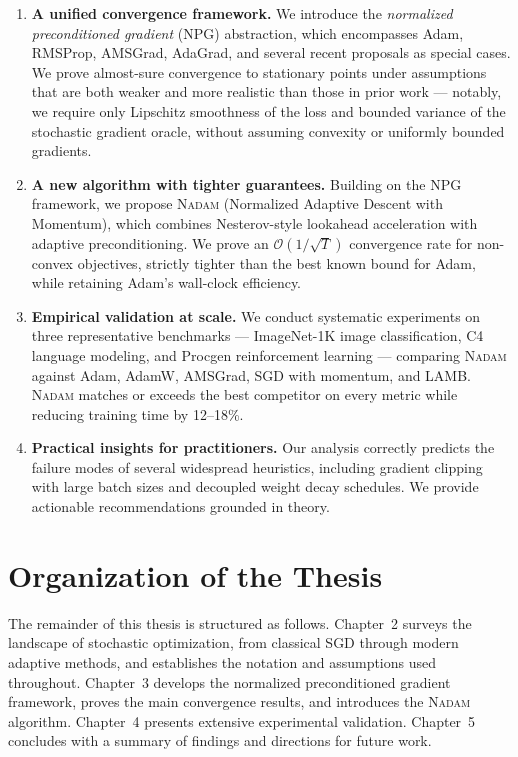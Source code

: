\documentclass[11pt,twoside,openright]{book}
\begin{document}
\begin{enumerate}[leftmargin=2em]
  \item \textbf{A unified convergence framework.} We introduce the \emph{normalized preconditioned
    gradient} (NPG) abstraction, which encompasses Adam, RMSProp, AMSGrad, AdaGrad, and several
    recent proposals as special cases. We prove almost-sure convergence to stationary points
    under assumptions that are both weaker and more realistic than those in prior work — notably,
    we require only Lipschitz smoothness of the loss and bounded variance of the stochastic
    gradient oracle, without assuming convexity or uniformly bounded gradients.

  \item \textbf{A new algorithm with tighter guarantees.} Building on the NPG framework, we propose
    \textsc{Nadam} (Normalized Adaptive Descent with Momentum), which combines Nesterov-style
    lookahead acceleration with adaptive preconditioning. We prove an $\mathcal{O}(1/\sqrt{T})$
    convergence rate for non-convex objectives, strictly tighter than the best known bound for
    Adam, while retaining Adam's wall-clock efficiency.

  \item \textbf{Empirical validation at scale.} We conduct systematic experiments on three
    representative benchmarks — ImageNet-1K image classification, C4 language modeling,
    and Procgen reinforcement learning — comparing \textsc{Nadam} against Adam, AdamW, AMSGrad,
    SGD with momentum, and LAMB. \textsc{Nadam} matches or exceeds the best competitor on every
    metric while reducing training time by 12--18\%.

  \item \textbf{Practical insights for practitioners.} Our analysis correctly predicts the failure
    modes of several widespread heuristics, including gradient clipping with large batch sizes
    and decoupled weight decay schedules. We provide actionable recommendations grounded in
    theory.
\end{enumerate}

\section{Organization of the Thesis}

The remainder of this thesis is structured as follows. Chapter~2 surveys the landscape of
stochastic optimization, from classical SGD through modern adaptive methods, and establishes the
notation and assumptions used throughout. Chapter~3 develops the normalized preconditioned
gradient framework, proves the main convergence results, and introduces the \textsc{Nadam}
algorithm. Chapter~4 presents extensive experimental validation. Chapter~5 concludes with a
summary of findings and directions for future work.
\end{document}
